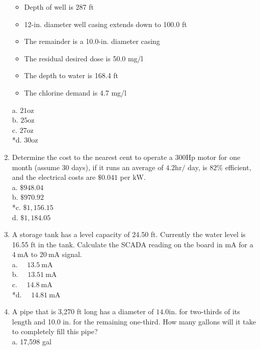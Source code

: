 \begin{enumerate}
\begin{itemize}
  \item Depth of well is 287 ft\\
  \item 12-in. diameter well casing extends down to 100.0 ft\\
  \item The remainder is a 10.0-in. diameter casing\\
  \item The residual desired dose is 50.0 mg/l\\
  \item The depth to water is 168.4 ft\\
  \item The chlorine demand is 4.7 mg/l\\
  \end{itemize}
a. $21 \mathrm{oz}$\\
b. $25 \mathrm{oz}$\\
c. $27 \mathrm{oz}$\\
*d. $30 \mathrm{oz}$\\
  \item Determine the cost to the nearest cent to operate a $300 \mathrm{Hp}$ motor for one month (assume 30 days), if it runs an average of $4.2 \mathrm{hr} /$ day, is $82 \%$ efficient, and the electrical costs are $\$ 0.041$ per $\mathrm{kW}$.\\
a. $\$ 948.04$\\
b. $\$ 970.92$\\
*c. $\$ 1,156.15$\\
d. $\$ 1,184.05$\\
  \item A storage tank has a level capacity of 24.50 ft. Currently the water level is 16.55 ft in the tank. Calculate the SCADA reading on the board in $\mathrm{mA}$ for a $4 \mathrm{~mA}$ to $20 \mathrm{~mA}$ signal.\\
a. $\quad 13.5 \mathrm{~mA}$\\
b. $\quad 13.51 \mathrm{~mA}$\\
c. $\quad 14.8 \mathrm{~mA}$\\
*d. $\quad 14.81 \mathrm{~mA}$\\
  \item A pipe that is 3,270 ft long has a diameter of $14.0 \mathrm{in}$. for two-thirds of its length and 10.0 in. for the remaining one-third. How many gallons will it take to completely fill this pipe?\\
a. 17,598 gal\\

\end{enumerate}

